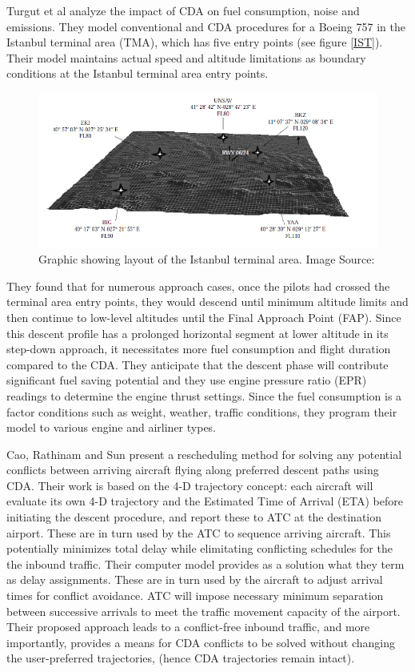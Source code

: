 \documentclass{aer1315-pretty}
\begin{document}
Turgut et al \cite{Enis:2010} analyze the impact of CDA on fuel consumption, noise and emissions. They model conventional and CDA procedures for a Boeing 757 in the Istanbul terminal area (TMA), which has five entry points (see figure \ref{IST}). Their model maintains actual speed and altitude limitations as boundary conditions at the Istanbul terminal area entry points. 

\begin{figure}
\centering
\includegraphics[height=0.45\textwidth]{figures/IST_terminal_area.png}
	\caption{Graphic showing layout of the Istanbul terminal area. Image Source: \cite{Enis:2010}}	
	\label{fig:IST}
\end{figure}

They found that for numerous approach cases, once the pilots had crossed the terminal area entry points, they would descend until minimum altitude limits and then continue to low-level altitudes until the Final Approach Point (FAP). Since this descent profile has a prolonged horizontal segment at lower altitude in its step-down approach, it necessitates more fuel consumption and flight duration compared to the CDA. They anticipate that the descent phase will contribute significant fuel saving potential and they use engine pressure ratio (EPR) readings to determine the engine thrust settings. Since the fuel consumption is a factor conditions such as weight, weather, traffic conditions, they program their model to various engine and airliner types. \par

Cao, Rathinam and Sun \cite{Cao:2011} present a rescheduling method for solving any potential conflicts between arriving aircraft flying along preferred descent paths using CDA. Their work is based on the 4-D trajectory concept: each aircraft will evaluate its own 4-D trajectory and the Estimated Time of Arrival (ETA) before initiating the descent procedure, and report these to ATC at the destination airport. These are in turn used by the ATC to sequence arriving aircraft. This potentially minimizes total delay while elimitating conflicting schedules for the the inbound traffic. Their computer model provides as a solution what they term as delay assignments. These are in turn used by the aircraft to adjust arrival times for conflict avoidance. ATC will impose necessary minimum separation between successive arrivals to meet the traffic movement capacity of the airport. Their proposed approach leads to a conflict-free inbound traffic, and more importantly, provides a means for CDA conflicts to be solved without changing the user-preferred trajectories, (hence CDA trajectories remain intact). \par
\end{document}

